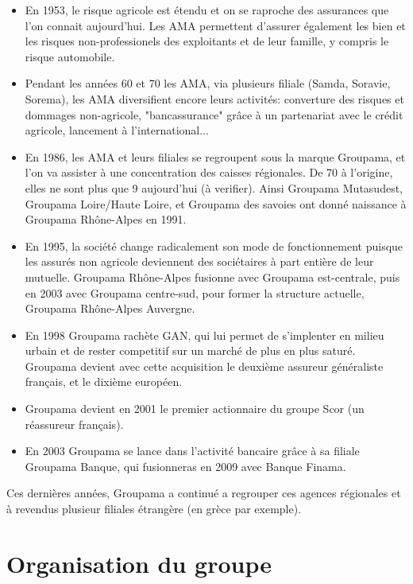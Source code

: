 \begin{itemize}
\item En 1953, le risque agricole est étendu et on se raproche des assurances que l'on connait aujourd'hui. Les AMA permettent d'assurer également les bien et les risques non-professionels des exploitants et de leur famille, y compris le risque automobile. 

\item Pendant les années 60 et 70 les AMA, via plusieurs filiale (Samda, Soravie, Sorema), les AMA diversifient encore leurs activités: converture des risques et dommages non-agricole, "bancassurance" grâce à un partenariat avec le crédit agricole, lancement à l'international...

\item En 1986, les AMA et leurs filiales se regroupent sous la marque Groupama, et l'on va assister à une concentration des caisses régionales. De 70 à l'origine, elles ne sont plus que 9 aujourd'hui (à verifier). Ainsi Groupama Mutasudest, Groupama Loire/Haute Loire, et Groupama des savoies ont donné naissance à Groupama Rhône-Alpes en 1991.

\item En 1995, la société change radicalement son mode de fonctionnement puisque les assurés non agricole deviennent des sociétaires à part entière de leur mutuelle. Groupama Rhône-Alpes fusionne avec Groupama est-centrale, puis en 2003 avec Groupama centre-sud, pour former la structure actuelle, Groupama Rhône-Alpes Auvergne.

\item En 1998 Groupama rachète GAN, qui lui permet de s'implenter en milieu urbain et de rester competitif sur un marché de plus en plus saturé. Groupama devient avec cette acquisition le deuxième assureur généraliste français, et le dixième européen.

\item Groupama devient en 2001 le premier actionnaire du groupe Scor (un réassureur français).

\item En 2003 Groupama se lance dans l'activité bancaire grâce à sa filiale Groupama Banque, qui fusionneras en 2009 avec Banque Finama. 
\end{itemize}

Ces dernières années, Groupama a continué a regrouper ces agences régionales et à revendus plusieur filiales étrangère (en grèce par exemple).

\section{Organisation du groupe}

